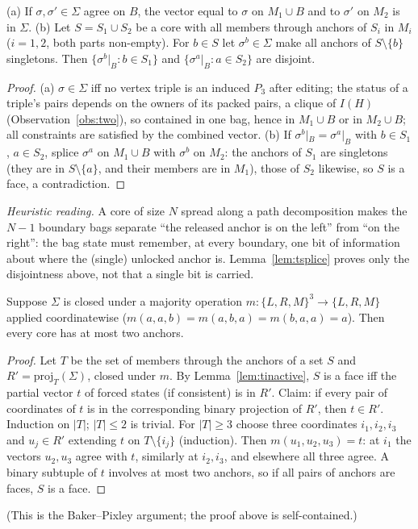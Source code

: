 \begin{lemma}[Splice]\label{lem:tsplice}
(a) If $\sigma,\sigma'\in\Sigma$ agree on $B$, the vector equal to $\sigma$ on $M_1\cup B$ and to $\sigma'$ on $M_2$ is in $\Sigma$.
(b) Let $S=S_1\cup S_2$ be a core with all members through anchors of $S_i$ in $M_i$ ($i=1,2$, both parts non-empty). For $b\in S$ let $\sigma^b\in\Sigma$ make all anchors of $S\setminus\{b\}$ singletons. Then $\{\sigma^b|_B:b\in S_1\}$ and $\{\sigma^a|_B:a\in S_2\}$ are disjoint.
\end{lemma}
\begin{proof}
(a) $\sigma\in\Sigma$ iff no vertex triple is an induced $P_3$ after editing; the status of a triple's pairs depends on the owners of its packed pairs, a clique of $I(H)$ (Observation~\ref{obs:two}), so contained in one bag, hence in $M_1\cup B$ or in $M_2\cup B$; all constraints are satisfied by the combined vector. (b) If $\sigma^b|_B=\sigma^a|_B$ with $b\in S_1$, $a\in S_2$, splice $\sigma^a$ on $M_1\cup B$ with $\sigma^b$ on $M_2$: the anchors of $S_1$ are singletons (they are in $S\setminus\{a\}$, and their members are in $M_1$), those of $S_2$ likewise, so $S$ is a face, a contradiction.
\end{proof}
\emph{Heuristic reading.} A core of size $N$ spread along a path decomposition makes the $N-1$ boundary bags separate ``the released anchor is on the left'' from ``on the right'': the bag state must remember, at every boundary, one bit of information about where the (single) unlocked anchor is. Lemma~\ref{lem:tsplice} proves only the disjointness above, not that a single bit is carried.

\begin{lemma}\label{lem:tmaj}
Suppose $\Sigma$ is closed under a majority operation $m:\{L,R,M\}^3\to\{L,R,M\}$ applied coordinatewise ($m(a,a,b)=m(a,b,a)=m(b,a,a)=a$). Then every core has at most two anchors.
\end{lemma}
\begin{proof}
Let $T$ be the set of members through the anchors of a set $S$ and $R'=\mathrm{proj}_T(\Sigma)$, closed under $m$. By Lemma~\ref{lem:tinactive}, $S$ is a face iff the partial vector $t$ of forced states (if consistent) is in $R'$. Claim: if every pair of coordinates of $t$ is in the corresponding binary projection of $R'$, then $t\in R'$. Induction on $|T|$; $|T|\le2$ is trivial. For $|T|\ge3$ choose three coordinates $i_1,i_2,i_3$ and $u_j\in R'$ extending $t$ on $T\setminus\{i_j\}$ (induction). Then $m(u_1,u_2,u_3)=t$: at $i_1$ the vectors $u_2,u_3$ agree with $t$, similarly at $i_2,i_3$, and elsewhere all three agree. A binary subtuple of $t$ involves at most two anchors, so if all pairs of anchors are faces, $S$ is a face.
\end{proof}
(This is the Baker--Pixley argument; the proof above is self-contained.)


